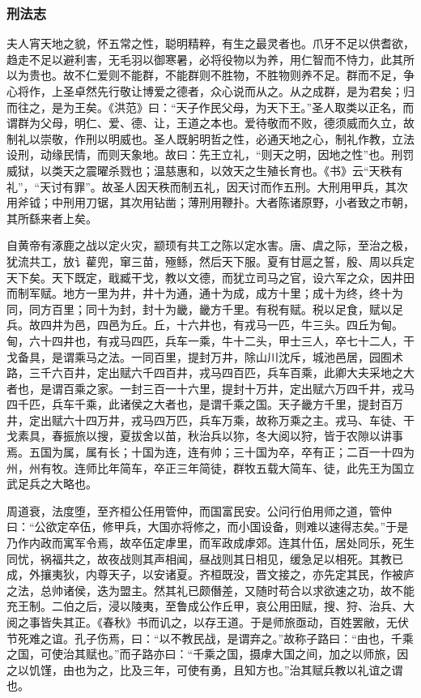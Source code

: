\documentclass[]{article}
\begin{document}
\hypertarget{header-n1558}{%
\subsubsection{刑法志}\label{header-n1558}}

夫人宵天地之貌，怀五常之性，聪明精粹，有生之最灵者也。爪牙不足以供耆欲，趋走不足以避利害，无毛羽以御寒暑，必将役物以为养，用仁智而不恃力，此其所以为贵也。故不仁爱则不能群，不能群则不胜物，不胜物则养不足。群而不足，争心将作，上圣卓然先行敬让博爱之德者，众心说而从之。从之成群，是为君矣；归而往之，是为王矣。《洪范》曰：``天子作民父母，为天下王。''圣人取类以正名，而谓群为父母，明仁、爱、德、让，王道之本也。爱待敬而不败，德须威而久立，故制礼以崇敬，作刑以明威也。圣人既躬明哲之性，必通天地之心，制礼作教，立法设刑，动缘民情，而则天象地。故曰：先王立礼，``则天之明，因地之性''也。刑罚威狱，以类天之震曜杀戮也；温慈惠和，以效天之生殖长育也。《书》云``天秩有礼''，``天讨有罪''。故圣人因天秩而制五礼，因天讨而作五刑。大刑用甲兵，其次用斧钺；中刑用刀锯，其次用钻凿；薄刑用鞭扑。大者陈诸原野，小者致之市朝，其所繇来者上矣。

自黄帝有涿鹿之战以定火灾，颛顼有共工之陈以定水害。唐、虞之际，至治之极，犹流共工，放讠雚兜，窜三苗，殛鲧，然后天下服。夏有甘扈之誓，殷、周以兵定天下矣。天下既定，戢臧干戈，教以文德，而犹立司马之官，设六军之众，因井田而制军赋。地方一里为井，井十为通，通十为成，成方十里；成十为终，终十为同，同方百里；同十为封，封十为畿，畿方千里。有税有赋。税以足食，赋以足兵。故四井为邑，四邑为丘。丘，十六井也，有戎马一匹，牛三头。四丘为甸。甸，六十四井也，有戎马四匹，兵车一乘，牛十二头，甲士三人，卒七十二人，干戈备具，是谓乘马之法。一同百里，提封万井，除山川沈斥，城池邑居，园囿术路，三千六百井，定出赋六千四百井，戎马四百匹，兵车百乘，此卿大夫采地之大者也，是谓百乘之家。一封三百一十六里，提封十万井，定出赋六万四千井，戎马四千匹，兵车千乘，此诸侯之大者也，是谓千乘之国。天子畿方千里，提封百万井，定出赋六十四万井，戎马四万匹，兵车万乘，故称万乘之主。戎马、车徒、干戈素具，春振旅以搜，夏拔舍以苗，秋治兵以狝，冬大阅以狩，皆于农隙以讲事焉。五国为属，属有长；十国为连，连有帅；三十国为卒，卒有正；二百一十四为州，州有牧。连师比年简车，卒正三年简徒，群牧五载大简车、徒，此先王为国立武足兵之大略也。

周道衰，法度堕，至齐桓公任用管仲，而国富民安。公问行伯用师之道，管仲曰：``公欲定卒伍，修甲兵，大国亦将修之，而小国设备，则难以速得志矣。''于是乃作内政而寓军令焉，故卒伍定虖里，而军政成虖郊。连其什伍，居处同乐，死生同忧，祸福共之，故夜战则其声相闻，昼战则其日相见，缓急足以相死。其教已成，外攘夷狄，内尊天子，以安诸夏。齐桓既没，晋文接之，亦先定其民，作被庐之法，总帅诸侯，迭为盟主。然其礼已颇僭差，又随时苟合以求欲速之功，故不能充王制。二伯之后，浸以陵夷，至鲁成公作丘甲，哀公用田赋，搜、狩、治兵、大阅之事皆失其正。《春秋》书而讥之，以存王道。于是师旅亟动，百姓罢敝，无伏节死难之谊。孔子伤焉，曰：``以不教民战，是谓弃之。''故称子路曰：``由也，千乘之国，可使治其赋也。''而子路亦曰：``千乘之国，摄虖大国之间，加之以师旅，因之以饥馑，由也为之，比及三年，可使有勇，且知方也。''治其赋兵教以礼谊之谓也。
\end{document}
